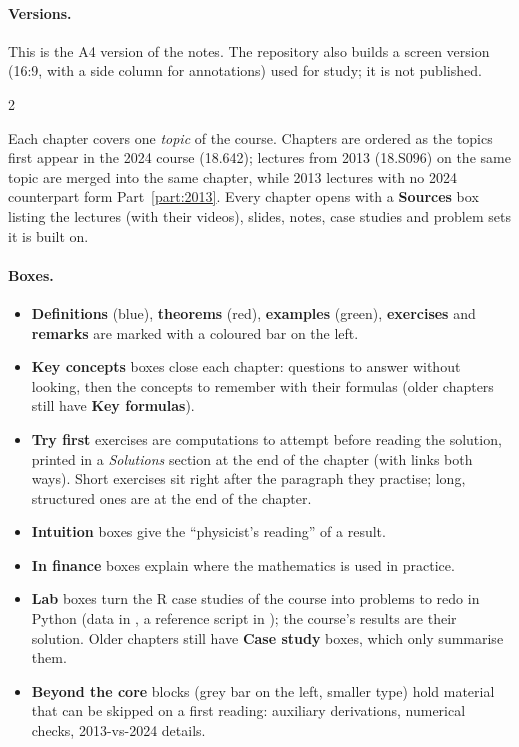\ifdefined\publicmode\documentclass[11pt,oneside,openany]{book}\else\documentclass[12pt,oneside,openany]{book}\fi
\begin{document}
\paragraph{Versions.} This is the A4 version of the notes. The repository also builds a screen version
(16:9, with a side column for annotations) used for study; it is not published.
\else
\begin{paracol}{2}

Each chapter covers one \emph{topic} of the course. Chapters are ordered as the topics first
appear in the 2024 course (18.642); lectures from 2013 (18.S096) on the same topic are merged
into the same chapter, while 2013 lectures with no 2024 counterpart form
Part~\ref{part:2013}. Every chapter opens with a \textbf{Sources} box listing the lectures
(with their videos), slides, notes, case studies and problem sets it is built on.

\paragraph{Boxes.}
\begin{itemize}
  \item \textcolor{defcol}{\textbf{Definitions}} (blue), \textcolor{thmcol}{\textbf{theorems}} (red),
        \textcolor{intcol}{\textbf{examples}} (green), \textcolor{exerdark}{\textbf{exercises}} and
        \textcolor{srccol}{\textbf{remarks}} are marked with a coloured bar on the left.
  \item \textcolor{keycol}{\textbf{Key concepts}} boxes close each chapter: questions to answer without looking,
        then the concepts to remember with their formulas (older chapters still have \textbf{Key formulas}).
  \item \textcolor{exerdark}{\textbf{Try first}} exercises are computations to attempt before reading the
        solution, printed in a \emph{Solutions} section at the end of the chapter (with links both ways). Short
        exercises sit right after the paragraph they practise; long, structured ones are at the end of the chapter.
  \item \textcolor{intucol}{\textbf{Intuition}} boxes give the ``physicist's reading'' of a result.
  \item \textcolor{fincol}{\textbf{In finance}} boxes explain where the mathematics is used in practice.
  \item \textcolor{cscol}{\textbf{Lab}} boxes turn the R case studies of the course into problems to redo in
        Python (data in , a reference script in ); the course's results are their
        solution. Older chapters still have \textbf{Case study} boxes, which only summarise them.
  \item \textbf{Beyond the core} blocks (grey bar on the left, smaller type) hold material that can be
        skipped on a first reading: auxiliary derivations, numerical checks, 2013-vs-2024 details.
\end{itemize}


\end{paracol}
\end{document}
